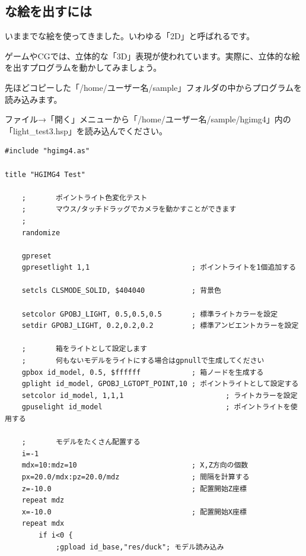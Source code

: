 

\newpage
\subsection{な絵を出すには}

いままでな絵を使ってきました。いわゆる「2D」と呼ばれるです。

ゲームやCGでは、立体的な「3D」表現が使われています。実際に、立体的な絵を出すプログラムを動かしてみましょう。


先ほどコピーした「/home/ユーザー名/sample」フォルダの中からプログラムを読み込みます。

ファイル→「開く」メニューから「/home/ユーザー名/sample/hgimg4」内の「light\_test3.hsp」を読み込んでください。


\begin{lstlisting}[caption=light\_test3.hspのプログラムの一部]
#include "hgimg4.as"

title "HGIMG4 Test"

    ;       ポイントライト色変化テスト
    ;       マウス/タッチドラッグでカメラを動かすことができます
    ;
    randomize

    gpreset
    gpresetlight 1,1                        ; ポイントライトを1個追加する

    setcls CLSMODE_SOLID, $404040           ; 背景色

    setcolor GPOBJ_LIGHT, 0.5,0.5,0.5       ; 標準ライトカラーを設定
    setdir GPOBJ_LIGHT, 0.2,0.2,0.2         ; 標準アンビエントカラーを設定

    ;       箱をライトとして設定します
    ;       何もないモデルをライトにする場合はgpnullで生成してください
    gpbox id_model, 0.5, $ffffff            ; 箱ノードを生成する
    gplight id_model, GPOBJ_LGTOPT_POINT,10 ; ポイントライトとして設定する
    setcolor id_model, 1,1,1                        ; ライトカラーを設定
    gpuselight id_model                             ; ポイントライトを使用する

    ;       モデルをたくさん配置する
    i=-1
    mdx=10:mdz=10                           ; X,Z方向の個数
    px=20.0/mdx:pz=20.0/mdz                 ; 間隔を計算する
    z=-10.0                                 ; 配置開始Z座標
    repeat mdz
    x=-10.0                                 ; 配置開始X座標
    repeat mdx
        if i<0 {
            ;gpload id_base,"res/duck"; モデル読み込み

\end{lstlisting}

